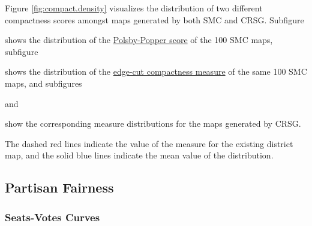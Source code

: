 Figure \ref{fig:compact.density} visualizes the distribution of two different compactness scores amongst maps generated by both SMC and CRSG. Subfigure
\begin{seriate} 
    \item shows the distribution of the \hyperref[sec:polsbypopper]{Polsby-Popper score} of the 100 SMC maps, subfigure
    \item shows the distribution of the \hyperref[sec:edgecut]{edge-cut compactness measure} of the same 100 SMC maps, and subfigures
    \item and 
    \item show the corresponding measure distributions for the maps generated by CRSG. 
\end{seriate}
The dashed red lines indicate the value of the measure for the existing district map, and the solid blue lines indicate the mean value of the distribution. 

\subsection{Partisan Fairness}

\subsubsection{Seats-Votes Curves}

